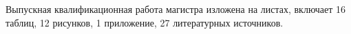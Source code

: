 




Выпускная квалификационная работа магистра изложена на \pageref{LastPage} листах, включает 16 таблиц, 12 рисунков, 1 приложение, 27 литературных источников.

\clearpage
